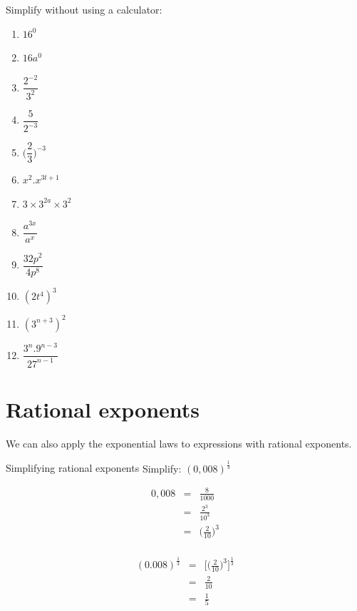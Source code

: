 \begin{exercises}{}{
Simplify without using a calculator:
\begin{multicols}{2}
\begin{enumerate}[label=\textbf{\arabic*}., itemsep=5pt]
 \item $16^0$
 \item $16a^0$
 \item $\dfrac{2^{-2}}{3^2}$
 \item $ \dfrac{5}{2^{-3}}$
 \item $ \Big(\dfrac{2}{3}\Big)^{-3} $
 \item $ x^2 . x^{3t+1} $
 \item $ 3 \times 3^{2a} \times 3^2$
 \item $ \dfrac{a^{3x}}{a^x} $
 \item $ \dfrac{32p^2}{4p^8}$
 \item $ (2t^4)^3$
 \item $ (3^{n+3})^2$
 \item $ \dfrac{3^n . 9^{n-3}}{27^{n-1}}$
\end{enumerate}
\end{multicols}
}
\end{exercises}

\section{Rational exponents}

We can also apply the exponential laws to expressions with rational exponents.

\begin{wex}
{%
Simplifying rational exponents
} 
{%
Simplify: 
$ (0,008)^{\frac{1}{3}}$
}
{%

\begin{eqnarray*}
 0,008 & = & \frac{8}{1000} \\
       & = & \frac{2^3}{10^3} \\
       & = & \Big(\frac{2}{10}\Big)^3\\
\end{eqnarray*}

\begin{eqnarray*}
 (0.008)^{\frac{1}{3}} & = & \Big[\Big(\frac{2}{10}\Big)^3\Big]^{\frac{1}{3}} \\
		 & = & \frac{2}{10} \\
		 & = & \frac{1}{5}
\end{eqnarray*}
}
\end{wex}

